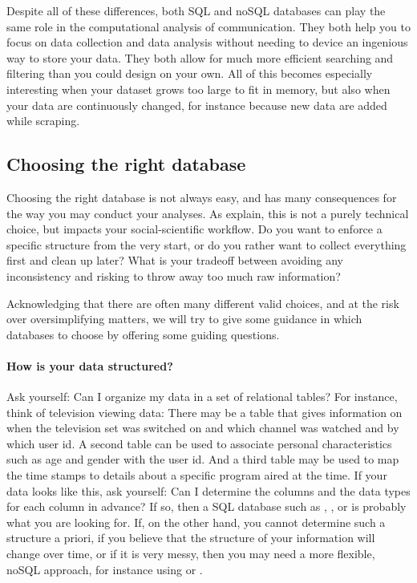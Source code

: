 Despite all of these differences, both SQL and noSQL databases can play
the same role in the computational analysis of communication. They both
help you to focus on data collection and data analysis without needing
to device an ingenious way to store your data. They both allow for much
more efficient searching and filtering than you could design on your own.
All of this becomes especially interesting when your dataset grows too
large to fit in memory, but also when your data are continuously changed,
for instance because new data are added while scraping.


\subsection{Choosing the right database}
Choosing the right database is not always easy, and has many consequences
for the way you may conduct your analyses. As \citet{Gunther2018} explain,
this is not a purely technical choice, but impacts your social-scientific
workflow. Do you want to enforce a specific structure from the very
start, or do you rather want to collect everything first and clean up
later? What is your tradeoff between avoiding any inconsistency and risking
to throw away too much raw information? 

Acknowledging that there are often many different valid choices, and at
the risk over oversimplifying matters, we will try to give some guidance
in which databases to choose by offering some guiding questions.


\paragraph[How is your data structured?]{How is your data structured?\eatpunct}
Ask yourself: Can I organize my data
in a set of relational tables? For instance, think of television
viewing data: There may be a table that gives information on when the
television set was switched on and which channel was watched and by
which user id. A second table can be used to associate personal
characteristics such as age and gender with the user id. And a third
table may be used to map the time stamps to details about a specific
program aired at the time.  If your data looks like this, ask
yourself: Can I determine the columns and the data types for each
column in advance?  If so, then a SQL database such as ,
, or  is probably what you are looking
for. If, on the other hand, you cannot determine such a structure a
priori, if you believe that the structure of your information will
change over time, or if it is very messy, then you may need a more
flexible, noSQL approach, for instance using  or
.

